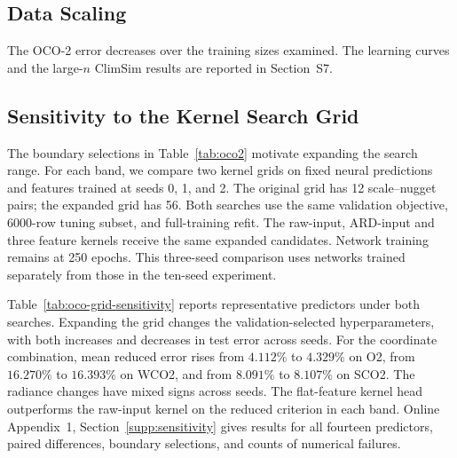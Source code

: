 \documentclass[twoside,11pt]{article}
\newcommand{\sensOtwoComboOldRed}{4.112}
\newcommand{\sensOtwoComboNewRed}{4.329}
\newcommand{\sensWcoComboOldRed}{16.270}
\newcommand{\sensWcoComboNewRed}{16.393}
\newcommand{\sensScoComboOldRed}{8.091}
\newcommand{\sensScoComboNewRed}{8.107}
\begin{document}
\subsection{Data Scaling}
\label{sec:oco-scaling-summary}
The OCO-2 error decreases over the training sizes examined. The learning
curves and the large-$n$ ClimSim results are reported in Section~S7.

\subsection{Sensitivity to the Kernel Search Grid}
\label{sec:oco-grid-sensitivity}
The boundary selections in Table~\ref{tab:oco2} motivate expanding
the search range. For each band, we compare two kernel grids on fixed neural predictions
and features trained at seeds 0, 1, and 2. The original grid has 12 scale--nugget pairs;
the expanded grid has 56. Both searches use the same validation objective,
6000-row tuning subset, and full-training refit. The raw-input, ARD-input
and three feature kernels receive the same expanded candidates. Network
training remains at 250 epochs. This three-seed comparison uses networks trained separately from those
in the ten-seed experiment.

Table~\ref{tab:oco-grid-sensitivity} reports representative predictors
under both searches. Expanding the grid changes the validation-selected
hyperparameters, with both increases and decreases in test error across
seeds. For the coordinate combination, mean reduced
error rises from $\sensOtwoComboOldRed\%$ to $\sensOtwoComboNewRed\%$ on O2,
from $\sensWcoComboOldRed\%$ to $\sensWcoComboNewRed\%$ on WCO2, and from
$\sensScoComboOldRed\%$ to $\sensScoComboNewRed\%$ on SCO2. The radiance
changes have mixed signs across seeds. The flat-feature kernel head
outperforms the raw-input kernel on the reduced criterion in each band.
Online Appendix~1, Section~\ref{supp:sensitivity}
gives results for all fourteen predictors, paired differences, boundary selections,
and counts of numerical failures.
\end{document}
